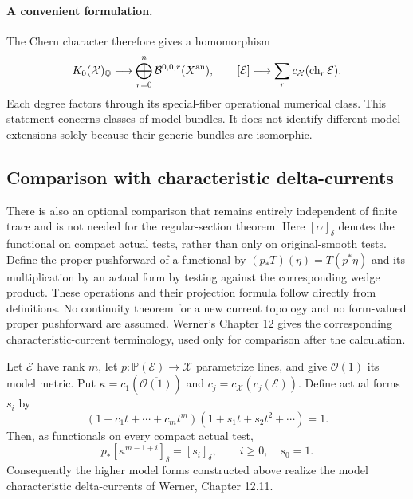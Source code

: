 \paragraph{A convenient formulation.}
The Chern character therefore gives a homomorphism
\[
 K_0(\mathcal X)_{\mathbb Q}\longrightarrow
      \bigoplus_{r=0}^{n}\mathcal B^{0,0,r}(X^{\rm an}),
                  \qquad [\mathcal E]\longmapsto
                       \sum_r c_{\mathcal X}(\operatorname{ch}_r\mathcal E).
\]
Each degree factors through its special-fiber operational numerical
class.  This statement concerns classes of model bundles.  It does
not identify different model extensions solely because their generic
bundles are isomorphic.

\subsection{Comparison with characteristic delta-currents}

There is also an optional comparison that remains entirely independent
of finite trace and is not needed for the regular-section theorem.
Here $[\alpha]_\delta$ denotes the functional on compact actual tests,
rather than only on original-smooth tests.  Define the proper pushforward
of a functional by $(p_*T)(\eta)=T(p^*\eta)$ and its multiplication by
an actual form by testing against the corresponding wedge product.
These operations and their projection formula follow directly from
definitions.  No continuity theorem for a new current topology and no
form-valued proper pushforward are assumed.  Werner's Chapter 12 gives
the corresponding characteristic-current terminology, used only for
comparison after the calculation.

\begin{proposition}
\label{r10c:segre}
Let $\mathcal E$ have rank $m$, let
$p:\mathbb P(\mathcal E)\to\mathcal X$ parametrize lines, and give
$\mathcal O(1)$ its model metric.  Put
$\kappa=c_1(\overline{\mathcal O(1)})$ and
$c_j=c_{\mathcal X}(c_j(\mathcal E))$.  Define actual forms $s_i$ by
\[
 (1+c_1t+\cdots+c_mt^m)(1+s_1t+s_2t^2+\cdots)=1.
\]
Then, as functionals on every compact actual test,
\[
          p_*[\kappa^{m-1+i}]_\delta=[s_i]_\delta,
                      \qquad i\geq0,\quad s_0=1.
\]
Consequently the higher model forms constructed above realize the
model characteristic delta-currents of Werner, Chapter 12.11.
\end{proposition}

